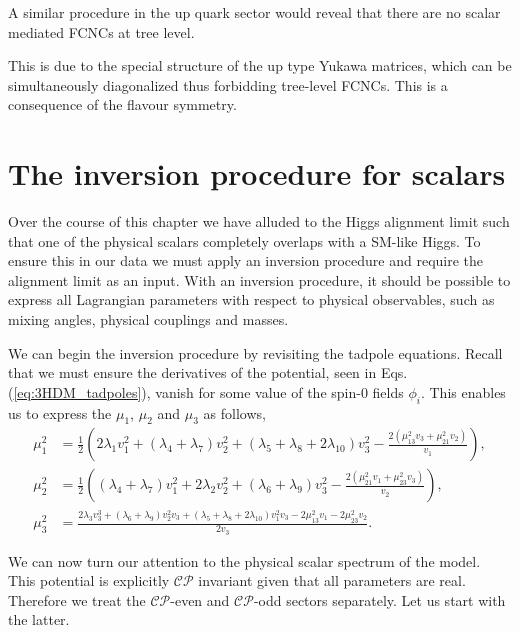\documentclass[10pt]{report}
\begin{document}
A similar procedure in the up quark sector would reveal that there are no scalar mediated FCNCs at tree level. 

%
This is due to the special structure of the up type Yukawa matrices, which can be simultaneously diagonalized thus forbidding tree-level FCNCs. 
%
This is a consequence of the flavour symmetry. 

\section{The inversion procedure for scalars}

Over the course of this chapter we have alluded to the Higgs alignment limit such that one of the physical scalars completely overlaps with a SM-like Higgs. To ensure this in our data we must apply an inversion procedure and require the alignment limit as an input. With an inversion procedure, it should be possible to express all Lagrangian parameters with respect to physical observables, such as mixing angles, physical couplings and masses.

We can begin the inversion procedure by revisiting the tadpole equations. Recall that we must ensure the derivatives of the potential, seen in Eqs.\,(\ref{eq:3HDM_tadpoles}), vanish for some value of the spin-0 fields $\phi_i$. This enables us to express the $\mu_1$, $\mu_2$ and $\mu_3$ as follows, 
%
\begin{equation}
\label{eq:3HDM_Param_1}
\begin{split}
%
\mu _1^2& =\frac{1}{2} \left(2 \lambda _1 v_1^2+\left(\lambda _4+\lambda _7\right) v_2^2+\left(\lambda _5+\lambda _8+2 \lambda _{10}\right) v_3^2-\frac{2 \left(\mu _{13}^2 v_3+\mu _{21}^2
	v_2\right)}{v_1}\right) , \\ 
%
\mu _2^2 & =\frac{1}{2} \left(\left(\lambda _4+\lambda _7\right) v_1^2+2 \lambda _2 v_2^2+\left(\lambda _6+\lambda _9\right) v_3^2-\frac{2 \left(\mu _{21}^2 v_1+\mu _{23}^2 v_3\right)}{v_2}\right)  , \\ 
% 
\mu _3^2 & =\frac{2 \lambda _3 v_3^3+\left(\lambda _6+\lambda _9\right) v_2^2 v_3+\left(\lambda _5+\lambda _8+2 \lambda _{10}\right) v_1^2 v_3-2 \mu _{13}^2 v_1-2 \mu _{23}^2 v_2}{2 v_3} . 
\end{split}  
\end{equation}

We can now turn our attention to the physical scalar spectrum of the model. 
%
This potential is explicitly $\mathcal{CP}$ invariant given that all parameters are real. Therefore we treat the $\mathcal{CP}$-even and $\mathcal{CP}$-odd sectors separately. Let us start with the latter. 
\end{document}
